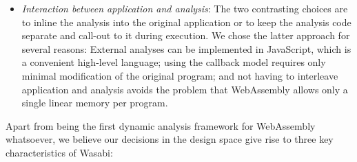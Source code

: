 \documentclass[sigplan,review,anonymous]{acmart}\settopmatter{printfolios=true,printccs=false,printacmref=false}
\begin{document}
\begin{itemize}[leftmargin=\parindent, label=$\circ$]
	\item \emph{Interaction between application and analysis}: The two contrasting choices are to inline the analysis into the original application or to keep the analysis code separate and call-out to it during execution. We chose the latter approach for several reasons: External analyses can be implemented in JavaScript, which is a convenient high-level language; using the callback model requires only minimal modification of the original program; and not having to interleave application and analysis avoids the problem that WebAssembly allows only a single linear memory per program.
%	
%	
%	
%	
%	
\end{itemize}

\noindent
Apart from being the first dynamic analysis framework for WebAssembly whatsoever, we believe our decisions in the design space give rise to three key characteristics of Wasabi:
\end{document}
